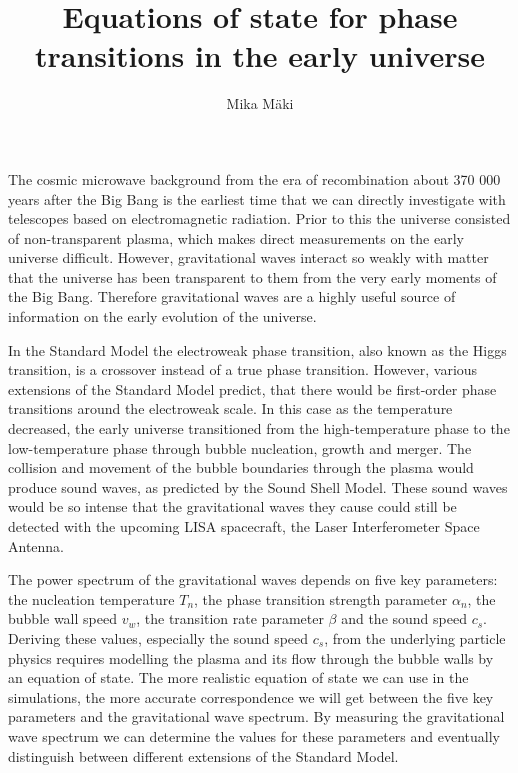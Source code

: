\documentclass[a4paper]{article}
\title{Equations of state for phase transitions in the early universe}
\author{Mika Mäki}
\date{\displaydate{date}}
\begin{document}
\maketitle

The cosmic microwave background from the era of recombination about 370 000 years after the Big Bang is the earliest time that we can directly investigate with telescopes based on electromagnetic radiation.
Prior to this the universe consisted of non-transparent plasma,
which makes direct measurements on the early universe difficult.
However, gravitational waves interact so weakly with matter that the universe has been transparent to them from the very early moments of the Big Bang.
Therefore gravitational waves are a highly useful source of information on the early evolution of the universe.
\cite{caprini_detecting_2020}

In the Standard Model the electroweak phase transition,
also known as the Higgs transition,
is a crossover instead of a true phase transition.
However, various extensions of the Standard Model predict,
that there would be first-order phase transitions around the electroweak scale.
\cite{caprini_detecting_2020}
In this case as the temperature decreased,
the early universe transitioned from the high-temperature phase to the low-temperature phase through bubble nucleation, growth and merger.
The collision and movement of the bubble boundaries through the plasma would produce sound waves,
as predicted by the Sound Shell Model.
\cite{gw_pt_ssm}
These sound waves would be so intense that the gravitational waves they cause could still be detected with the upcoming LISA spacecraft, the Laser Interferometer Space Antenna.
\cite{lecture_notes}

The power spectrum of the gravitational waves depends on five key parameters:
the nucleation temperature $T_n$, the phase transition strength parameter $\alpha_n$, the bubble wall speed $v_w$, the transition rate parameter $\beta$ and the sound speed $c_s$.
Deriving these values, especially the sound speed $c_s$, from the underlying particle physics requires modelling the plasma and its flow through the bubble walls by an equation of state.
The more realistic equation of state we can use in the simulations, the more accurate correspondence we will get between the five key parameters and the gravitational wave spectrum.
By measuring the gravitational wave spectrum we can determine the values for these parameters and eventually distinguish between different extensions of the Standard Model.
\cite{lecture_notes}
\end{document}
